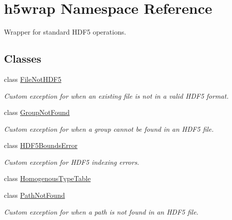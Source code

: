 \hypertarget{namespaceh5wrap}{\section{h5wrap Namespace Reference}
\label{namespaceh5wrap}
}


Wrapper for standard H\+D\+F5 operations.  


\subsection*{Classes}
\begin{DoxyCompactItemize}
\item 
class \hyperlink{classh5wrap_1_1_file_not_h_d_f5}{File\+Not\+H\+D\+F5}
\begin{DoxyCompactList}\small\item\em Custom exception for when an existing file is not in a valid H\+D\+F5 format. \end{DoxyCompactList}\item 
class \hyperlink{classh5wrap_1_1_group_not_found}{Group\+Not\+Found}
\begin{DoxyCompactList}\small\item\em Custom exception for when a group cannot be found in an H\+D\+F5 file. \end{DoxyCompactList}\item 
class \hyperlink{classh5wrap_1_1_h_d_f5_bounds_error}{H\+D\+F5\+Bounds\+Error}
\begin{DoxyCompactList}\small\item\em Custom exception for H\+D\+F5 indexing errors. \end{DoxyCompactList}\item 
class \hyperlink{classh5wrap_1_1_homogenous_type_table}{Homogenous\+Type\+Table}
\item 
class \hyperlink{classh5wrap_1_1_path_not_found}{Path\+Not\+Found}
\begin{DoxyCompactList}\small\item\em Custom exception for when a path is not found in an H\+D\+F5 file. \end{DoxyCompactList}\end{DoxyCompactItemize}
